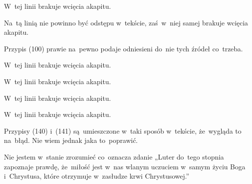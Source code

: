 \documentclass[a4paper,11pt]{article}
\begin{document}
\start {} W~tej linii brakuje wcięcia akapitu.

\vspace{\spaceFour}





\start {} Na~tą linią nie powinno być odstępu w~tekście,
zaś~w~niej samej brakuje wcięcia akapitu.

\vspace{\spaceFour}





\start {} Przypis (100) prawie na~pewno podaje odniesieni
do~nie tych źródeł co~trzeba.

\vspace{\spaceFour}





\start {} W~tej linii brakuje wcięcia akapitu.

\vspace{\spaceFour}





\start {} W~tej linii brakuje wcięcia akapitu.

\vspace{\spaceFour}





\start {} W~tej linii brakuje wcięcia akapitu.

\vspace{\spaceFour}





\start {} W~tej linii brakuje wcięcia akapitu.

\vspace{\spaceFour}





\start {} Przypisy (140) i~(141) są~umieszczone w~taki sposób
w~tekście, że~wygląda to na~błąd. Nie wiem jednak jaka to~poprawić.

\vspace{\spaceFour}





\start {} Nie jestem w~stanie zrozumieć co~oznacza zdanie
„Luter do~tego stopnia zapoznaje prawdę, że~miłość jest w~nas wlanym
uczuciem w~samym życiu Boga i~Chrystusa, które otrzymuje w~zasłudze
krwi Chrystusowej.”
\end{document}
